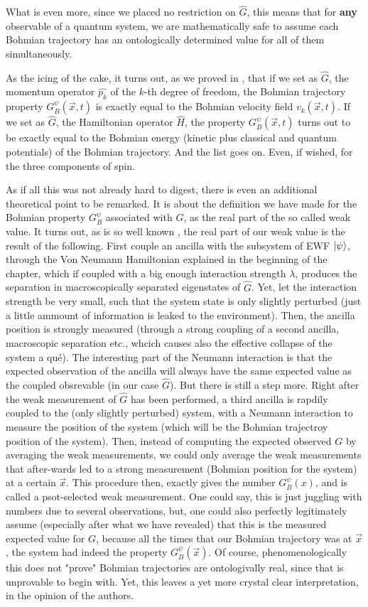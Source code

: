 \documentclass[11pt, a4paper]{article} %
\begin{document}
What is even more, since we placed no restriction on $\hat{G}$, this means that for {\bf any} observable of a quantum system, we are mathematically safe to assume each Bohmian trajectory has an ontologically determined value for all of them simultaneously.

As the icing of the cake, it turns out, as we proved in \cite{DevInPosition1}, that if we set as $\hat{G}$, the momentum operator $\hat{p_k}$ of the $k$-th degree of freedom, the Bohmian trajectory property $G^\psi_B(\vec{x},t)$ is exactly equal to the Bohmian velocity field $v_k(\vec{x},t)$. If we set as $\hat{G}$, the Hamiltonian operator $\hat{H}$, the property $G^\psi_B(\vec{x},t)$ turns out to be exactly equal to the Bohmian energy (kinetic plus classical and quantum potentials) of the Bohmian trajectory. And the list goes on. Even, if wished, for the three components of spin.

As if all this was not already hard to digest, there is even an additional theoretical point to be remarked. It is about the definition we have made for the Bohmian property $G_B^\psi$ associated with $G$, as the real part of the so called weak value. It turns out, as is so well known \cite{Weak}, the real part of our weak value is the result of the following. First couple an ancilla with the subsystem of EWF $\ket{\psi}$, through the Von Neumann Hamiltonian explained in the beginning of the chapter, which if coupled with a big enough interaction strength $\lambda$, produces the separation in macroscopically separated eigenstates of $\hat{G}$. Yet, let the interaction strength be very small, such that the system state is only slightly perturbed (just a little ammount of information is leaked to the environment). Then, the ancilla position is strongly measured (through a strong coupling of a second ancilla, macroscopic separation etc., whcich causes also the effective collapse of the system a qué). The interesting part of the Neumann interaction is that the expected observation of the ancilla will always have the same expected value as the coupled obsrevable (in our case $\hat{G}$). But there is still a step more. Right after the weak measurement of $\hat{G}$ has been performed, a third ancilla is rapdily coupled to the (only slightly perturbed) system, with a Neumann interaction to measure the position of the system (which will be the Bohmian trajectroy position of the system). Then, instead of computing the expected observed $G$ by averaging the weak measurements, we could only average the weak measurements that after-wards led to a strong measurement (Bohmian position for the system) at a certain $\vec{x}$. This procedure then, exactly gives the number $G^\psi_B(x)$, and is called a psot-selected weak measurement. One could say, this is just juggling with numbers due to several observations, but, one could also perfectly legitimately assume (especially after what we have revealed) that this is the measured expected value for $G$, because all the times that our Bohmian trajectory was at $\vec{x}$, the system had indeed the property $G^\psi_B(\vec{x})$. Of course, phenomenologically this does not "prove" Bohmian trajectories are ontologivally real, since that is unprovable to begin with. Yet, this leaves a yet more crystal clear interpretation, in the opinion of the authors.
\end{document}
